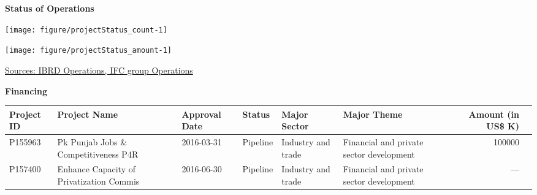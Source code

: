 \documentclass{article}\usepackage[]{graphicx}\usepackage[]{color}
\makeatletter
\def\maxwidth{ %
  \ifdim\Gin@nat@width>\linewidth
    \linewidth
  \else
    \Gin@nat@width
  \fi
}
\makeatother
\begin{document}
\begin{minipage}[b]{0.99\textwidth} %
\vspace*{0.5cm}
\raggedright{\color{white!30!blue} \textbf{\large Status of Operations}}
     \vspace*{0.5cm}
     
  \begin{minipage}[t]{0.99\textwidth}
    \begin{minipage}[c]{0.49\textwidth}
      \vspace*{0.2cm}
      \vspace*{0.3cm}


{\centering \texttt{[image: figure/projectStatus\_count-1]} 

}



      \end{minipage}
      \begin{minipage}[c]{0.49\textwidth}


{\centering \texttt{[image: figure/projectStatus\_amount-1]} 

}



      \end{minipage}
 
\raggedright{\footnotesize{\href{http://www.worldbank.org/en/topic/macroeconomics/overview}{Sources: IBRD Operations, IFC group Operations}}}
   \end{minipage}
  
   \begin{minipage}[b]{0.99\textwidth} %
     \vspace*{1cm}
     \begin{minipage}[c]{0.99\textwidth}  
     \raggedright{\color{white!30!blue} \textbf{\large Financing}}
     \vspace*{0.5cm}
     
{\footnotesize
\begin{tabular}{l>{\raggedright}p{1in}ll>{\raggedright}p{1in}>{\raggedright}p{1in}rl}
 Project ID & Project Name & Approval Date & Status & Major Sector & Major Theme & Amount (in US\$ K) &  \\ 
  \hline
P155963 & Pk Punjab Jobs \& Competitiveness P4R & 2016-03-31 & Pipeline & Industry and trade & Financial and private sector development & 100000 &  \\ 
  P157400 & Enhance Capacity of Privatization Commis & 2016-06-30 & Pipeline & Industry and trade & Financial and private sector development & ---    &  \\ 
  \end{tabular}
}


\end{minipage}
\end{minipage}
\end{minipage}
\end{document}
